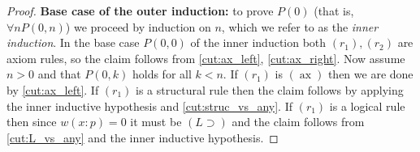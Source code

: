 \documentclass[english,letter paper,12pt,leqno]{article}
\theoremstyle{example}
\numberwithin{equation}{section}
\def\imp{\supset}
\begin{document}
\begin{proof}
\textbf{Base case of the outer induction:} to prove $P(0)$ (that is, $\forall n P(0,n)$) we proceed by induction on $n$, which we refer to as the \emph{inner induction}. In the base case $P(0,0)$ of the inner induction both $(r_1),(r_2)$ are axiom rules, so the claim follows from \eqref{cut:ax_left}, \eqref{cut:ax_right}. Now assume $n > 0$ and that $P(0,k)$ holds for all $k < n$. If $(r_1)$ is $(\operatorname{ax})$ then we are done by \eqref{cut:ax_left}. If $(r_1)$ is a structural rule then the claim follows by applying the inner inductive hypothesis and \eqref{cut:struc_vs_any}. If $(r_1)$ is a logical rule then since $w(x:p) = 0$ it must be $(L \imp)$ and the claim follows from \eqref{cut:L_vs_any} and the inner inductive hypothesis.

\end{proof}
\end{document}
